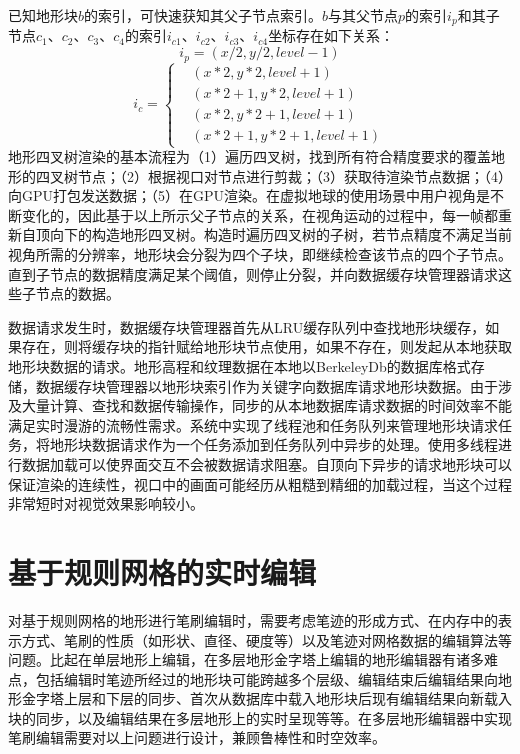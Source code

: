 已知地形块$b$的索引，可快速获知其父子节点索引。$b$与其父节点$p$的索引$i_p$和其子节点$c_1$、$c_2$、$c_3$、$c_4$的索引$i_{c1}$、$i_{c2}$、$i_{c3}$、$i_{c4}$坐标存在如下关系：
\begin{equation}
i_p = (x/2,y/2,level-1)
\end{equation}
\begin{equation}
i_c = \left\{ \begin{aligned}
&(x*2,y*2,level+1)\\
&(x*2+1,y*2,level+1)\\
&(x*2,y*2+1,level+1)\\
&(x*2+1,y*2+1,level+1)
\end{aligned} \right.
\end{equation}
地形四叉树渲染的基本流程为（1）遍历四叉树，找到所有符合精度要求的覆盖地形的四叉树节点；（2）根据视口对节点进行剪裁；（3）获取待渲染节点数据；（4）向GPU打包发送数据；（5）在GPU渲染。在虚拟地球的使用场景中用户视角是不断变化的，因此基于以上所示父子节点的关系，在视角运动的过程中，每一帧都重新自顶向下的构造地形四叉树。构造时遍历四叉树的子树，若节点精度不满足当前视角所需的分辨率，地形块会分裂为四个子块，即继续检查该节点的四个子节点。直到子节点的数据精度满足某个阈值，则停止分裂，并向数据缓存块管理器请求这些子节点的数据。\par
数据请求发生时，数据缓存块管理器首先从LRU缓存队列中查找地形块缓存，如果存在，则将缓存块的指针赋给地形块节点使用，如果不存在，则发起从本地获取地形块数据的请求。地形高程和纹理数据在本地以BerkeleyDb\supercite{Db}的数据库格式存储，数据缓存块管理器以地形块索引作为关键字向数据库请求地形块数据。由于涉及大量计算、查找和数据传输操作，同步的从本地数据库请求数据的时间效率不能满足实时漫游的流畅性需求。系统中实现了线程池和任务队列来管理地形块请求任务，将地形块数据请求作为一个任务添加到任务队列中异步的处理。使用多线程进行数据加载可以使界面交互不会被数据请求阻塞。自顶向下异步的请求地形块可以保证渲染的连续性，视口中的画面可能经历从粗糙到精细的加载过程，当这个过程非常短时对视觉效果影响较小。
\par

\section{基于规则网格的实时编辑}
对基于规则网格的地形进行笔刷编辑时，需要考虑笔迹的形成方式、在内存中的表示方式、笔刷的性质（如形状、直径、硬度等）以及笔迹对网格数据的编辑算法等问题。比起在单层地形上编辑，在多层地形金字塔上编辑的地形编辑器有诸多难点，包括编辑时笔迹所经过的地形块可能跨越多个层级、编辑结束后编辑结果向地形金字塔上层和下层的同步、首次从数据库中载入地形块后现有编辑结果向新载入块的同步，以及编辑结果在多层地形上的实时呈现等等。在多层地形编辑器中实现笔刷编辑需要对以上问题进行设计，兼顾鲁棒性和时空效率。\par
